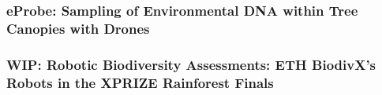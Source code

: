 \subsubsection{eProbe: Sampling of Environmental DNA within Tree Canopies with Drones \cite{Kirchgeorg2024}}

\subsubsection{WIP: Robotic Biodiversity Assessments: ETH BiodivX's Robots in the XPRIZE Rainforest Finals}





